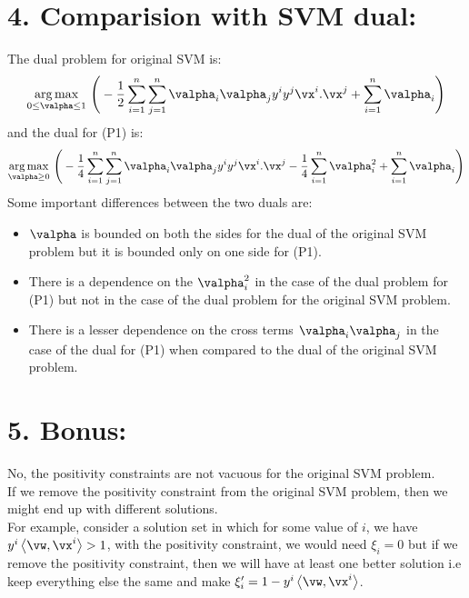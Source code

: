 \documentclass[a4paper,11pt]{article}
\begin{document}
\begin{mlsolution}
\section*{4. Comparision with SVM dual:}
The dual problem for original SVM is:
$$\underset{0 \leq \valpha \leq 1}{\arg \max} \ \Bigg( -\frac{1}{2}\sum_{i=1}^n \sum_{j=1}^n\valpha_i\valpha_j y^i y^j {\vx^i.}{\vx^j} + \sum_{i=1}^n\valpha_i \Bigg)   $$ and the dual for (P1) is:
$$ \underset{\valpha \geq 0}{\arg \max} \ \Bigg( -\frac{1}{4}\sum_{i=1}^n \sum_{j=1}^n\valpha_i\valpha_j y^i y^j {\vx^i.}{\vx^j} - \frac{1}{4}\sum_{i=1}^n\valpha_i^2 + \sum_{i=1}^n\valpha_i \Bigg) $$
Some important differences between the two duals are:
\begin{itemize}
\item $\valpha$ is bounded on both the sides for the dual of the original SVM problem but it is bounded only on one side for (P1).
\item There is a dependence on the $\valpha^2_i$ in the case of the dual problem for (P1) but not in the case of the dual problem for the original SVM problem.
\item There is a lesser dependence on the cross terms $\valpha_i\valpha_j$ in the case of the dual for (P1) when compared to the dual of the original SVM problem.
\end{itemize}

\section*{5. Bonus:}
No, the positivity constraints are not vacuous for the original SVM problem.
\\If we remove the positivity constraint from the original SVM problem, then we might end up with different solutions.
\\For example, consider a solution set in which for some value of $i$, we have $y^i\ip{\vw}{\vx^i} > 1$, with the positivity constraint, we would need $\xi_i = 0$ but if we remove the positivity constraint, then we will have at least one better solution i.e keep everything else the same and make $\xi'_i = 1 - y^i\ip{\vw}{\vx^i}$.


\end{mlsolution}
\end{document}

